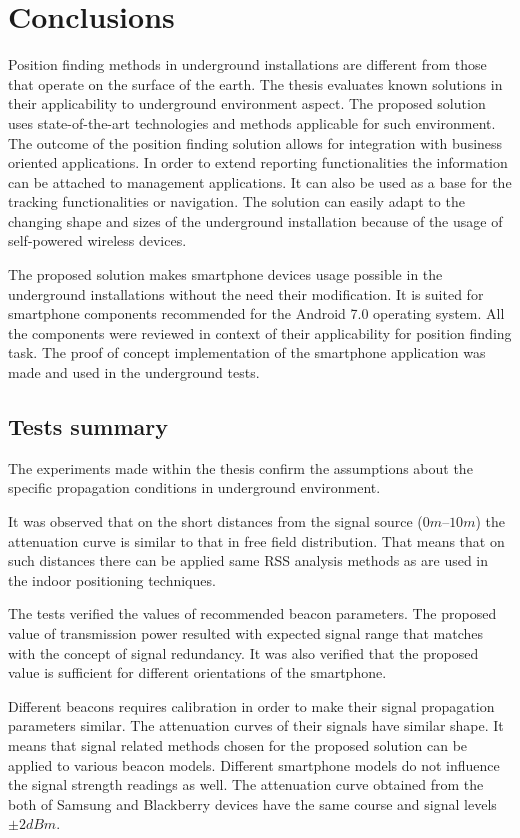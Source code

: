 \documentclass[../main.tex]{subfiles}
\begin{document}
\chapter{Conclusions}

Position finding methods in underground installations are different from those that operate on the surface of the earth. The thesis evaluates known solutions in their applicability to underground environment aspect. The proposed solution uses state-of-the-art technologies and methods applicable for such environment. The outcome of the position finding solution allows for integration with business oriented applications. In order to extend reporting functionalities the information can be attached to management applications. It can also be used as a base for the tracking functionalities or navigation. The solution can easily adapt to the changing shape and sizes of the underground installation because of the usage of self-powered wireless devices.

The proposed solution makes smartphone devices usage possible in the underground installations without the need their modification. It is suited for smartphone components recommended for the Android 7.0 operating system. All the components were reviewed in context of their applicability for position finding task. The proof of concept implementation of the smartphone application was made and used in the underground tests.

\section{Tests summary} %
\label{sec:tests_summary}

The experiments made within the thesis confirm the assumptions about the specific propagation conditions in underground environment.

It was observed that on the short distances from the signal source ($0m$--$10m$) the attenuation curve is similar to that in free field distribution. That means that on such distances there can be applied same RSS analysis methods as are used in the indoor positioning techniques.

The tests verified the values of recommended beacon parameters. The proposed value of transmission power resulted with expected signal range that matches with the concept of signal redundancy. It was also verified that the proposed value is sufficient for different orientations of the smartphone.

Different beacons requires calibration in order to make their signal propagation parameters similar. The attenuation curves of their signals have similar shape. It means that signal related methods chosen for the proposed solution can be applied to various beacon models. Different smartphone models do not influence the signal strength readings as well. The attenuation curve obtained from the both of Samsung and Blackberry devices have the same course and signal levels $\pm2dBm$.
\end{document}
